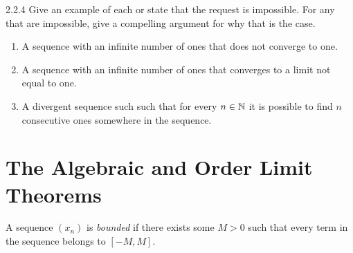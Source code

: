 \begin{exercise}
    {2.2.4} Give an example of each or state that the request is impossible.
    For any that are impossible, give a compelling argument for why that is the case.
    \begin{enumerate}
        \item A sequence with an infinite number of ones that does not converge to one.
        \item A sequence with an infinite number of ones that converges to a limit not equal to one.
        \item A divergent sequence such such that for every \(n \in \mathbb{N}\) it is possible to find \(n\) consecutive ones somewhere in the sequence.
    \end{enumerate}
\end{exercise}


\section{The Algebraic and Order Limit Theorems}

\begin{definition}
    A sequence \((x_n)\) is \textit{bounded} if there exists some \(M > 0\) such that every term in the sequence belongs to \([-M,M]\).
\end{definition}

